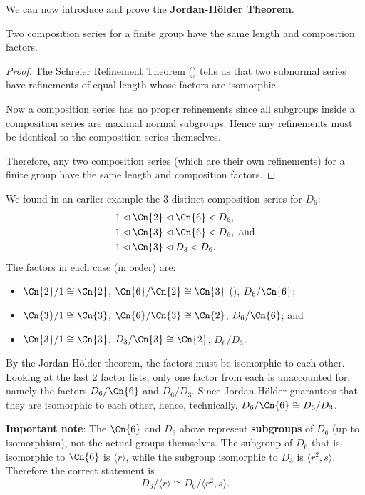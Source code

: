 We can now introduce and prove the \textbf{Jordan-H\"older Theorem}.
\begin{theorem}\label{thrm-jordan-holder}
    Two composition series for a finite group have the same length and composition factors.
\end{theorem}
\begin{proof}
    The Schreier Refinement Theorem () tells us that two subnormal series have refinements of equal length whose factors are isomorphic.
    
    Now a composition series has no proper refinements since all subgroups inside a composition series are maximal normal subgroups. Hence any refinements must be identical to the composition series themselves.
    
    Therefore, any two composition series (which are their own refinements) for a finite group have the same length and composition factors.
\end{proof}

\begin{example}
    We found in an earlier example the 3 distinct composition series for $D_6$:
    \begin{align*}
        &1 \lhd \Cn{2} \lhd \Cn{6} \lhd D_6,\\
        &1 \lhd \Cn{3} \lhd \Cn{6} \lhd D_6, \text{ and}\\
        &1 \lhd \Cn{3} \lhd D_3 \lhd D_6.
    \end{align*}
    The factors in each case (in order) are:
    \begin{itemize}
        \item $\Cn{2}/1 \cong \Cn{2}$, $\Cn{6}/\Cn{2} \cong \Cn{3}$ (), $D_6 / \Cn{6}$;
        \item $\Cn{3}/1 \cong \Cn{3}$, $\Cn{6}/\Cn{3} \cong \Cn{2}$, $D_6 / \Cn{6}$; and
        \item $\Cn{3}/1 \cong \Cn{3}$, $D_3 / \Cn{3} \cong \Cn{2}$, $D_6 / D_3$.
    \end{itemize}
    By the Jordan-H\"older theorem, the factors must be isomorphic to each other. Looking at the last 2 factor lists, only one factor from each is unaccounted for, namely the factors $D_6 / \Cn{6}$ and $D_6 / D_3$. Since Jordan-H\"older guarantees that they are isomorphic to each other, hence, technically, $D_6 / \Cn{6} \cong D_6 / D_3$.

    \textbf{Important note}: The $\Cn{6}$ and $D_3$ above represent \textbf{subgroups} of $D_6$ (up to isomorphism), not the actual groups themselves. The subgroup of $D_6$ that is isomorphic to $\Cn{6}$ is $\langle r \rangle$, while the subgroup isomorphic to $D_3$ is $\langle r^2, s\rangle$. Therefore the correct statement is
    \[
        D_6 / \langle r \rangle \cong D_6 / \langle r^2, s\rangle.
    \]
\end{example}

